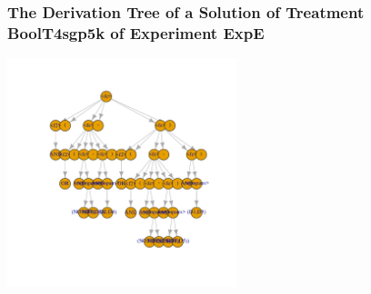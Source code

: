 \begin{frame}
 \frametitle{ The Derivation Tree of a Solution of Treatment BoolT4sgp5k of Experiment ExpE }
 \begin{center}
\includegraphics[width=0.5\textwidth, angle=0]
{ExpEDerivationTreeFigure003.pdf}
 \end{center}
 \label{report/ExpEDerivationTreeFigure003.pdf}  
 \end{frame}

